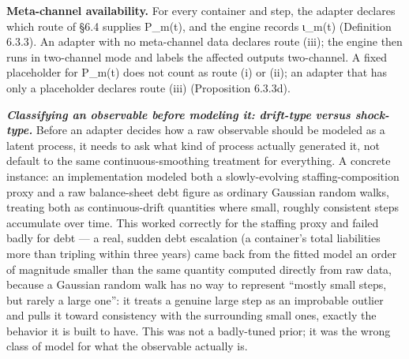 \documentclass[
]{article}
\begin{document}
\textbf{Meta-channel availability.} For every container and step, the
adapter declares which route of §6.4 supplies P\_m(t), and the engine
records ι\_m(t) (Definition 6.3.3). An adapter with no meta-channel data
declares route (iii); the engine then runs in two-channel mode and
labels the affected outputs two-channel. A fixed placeholder for P\_m(t)
does not count as route (i) or (ii); an adapter that has only a
placeholder declares route (iii) (Proposition 6.3.3d).

\emph{\textbf{Classifying an observable before modeling it: drift-type
versus shock-type.}} Before an adapter decides how a raw observable
should be modeled as a latent process, it needs to ask what kind of
process actually generated it, not default to the same
continuous-smoothing treatment for everything. A concrete instance: an
implementation modeled both a slowly-evolving staffing-composition proxy
and a raw balance-sheet debt figure as ordinary Gaussian random walks,
treating both as continuous-drift quantities where small, roughly
consistent steps accumulate over time. This worked correctly for the
staffing proxy and failed badly for debt --- a real, sudden debt
escalation (a container's total liabilities more than tripling within
three years) came back from the fitted model an order of magnitude
smaller than the same quantity computed directly from raw data, because
a Gaussian random walk has no way to represent ``mostly small steps, but
rarely a large one'': it treats a genuine large step as an improbable
outlier and pulls it toward consistency with the surrounding small ones,
exactly the behavior it is built to have. This was not a badly-tuned
prior; it was the wrong class of model for what the observable actually
is.
\end{document}
